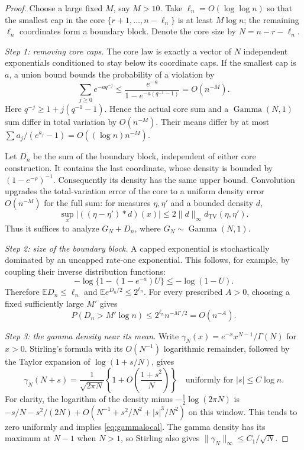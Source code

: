 \documentclass[11pt,oneside]{article}
\numberwithin{equation}{section}
\theoremstyle{plain}
\theoremstyle{definition}
\theoremstyle{remark}
\newcommand{\E}{\mathbb E}
\newcommand{\TV}{d_{\mathrm{TV}}}
\newcommand{\Gam}{\operatorname{Gamma}}
\begin{document}
\begin{proof}
Choose a large fixed $M$, say $M>10$. Take
$\ell_n=O(\log\log n)$ so that the smallest cap in the core
$\{r+1,\ldots,n-\ell_n\}$ is at least $M\log n$; the remaining
$\ell_n$ coordinates form a boundary block. Denote the core size by
$N=n-r-\ell_n$.

\emph{Step 1: removing core caps.}
The core law is exactly a vector of $N$ independent exponentials
conditioned to stay below its coordinate caps. If the smallest cap is
$a$, a union bound bounds the probability of a violation by
\[
 \sum_{j\ge0}e^{-a q^{-j}}
 \le\frac{e^{-a}}{1-e^{-a(q^{-1}-1)}}=O(n^{-M}).
\]
Here $q^{-j}\ge1+j(q^{-1}-1)$. Hence the actual core sum and a
$\Gam(N,1)$ sum differ in total variation by $O(n^{-M})$. Their means
differ by at most
$\sum a_j/(e^{a_j}-1)=O((\log n)n^{-M})$.

Let $D_n$ be the sum of the boundary block, independent of either
core construction. It contains the last coordinate, whose density is
bounded by $(1-e^{-\rho})^{-1}$. Consequently its density has the same
upper bound. Convolution upgrades the total-variation error of the
core to a uniform density error $O(n^{-M})$ for the full sum: for
measures $\eta,\eta'$ and a bounded density $d$,
\[
 \sup_x|((\eta-\eta')*d)(x)|
 \le 2\|d\|_\infty\TV(\eta,\eta').
\]
Thus it suffices to analyze $G_N+D_n$, where $G_N\sim\Gam(N,1)$.

\emph{Step 2: size of the boundary block.}
A capped exponential is stochastically dominated by an uncapped
rate-one exponential. This follows, for example, by coupling their
inverse distribution functions:
\[
 -\log\{1-(1-e^{-a})U\}\le-\log(1-U).
\]
Therefore $\E D_n\le\ell_n$ and
$\E e^{D_n/2}\le2^{\ell_n}$. For every prescribed $A>0$, choosing a
fixed sufficiently large $M'$ gives
\begin{equation}\label{eq:Dbound}
 P(D_n>M'\log n)\le2^{\ell_n}n^{-M'/2}=O(n^{-A}).
\end{equation}

\emph{Step 3: the gamma density near its mean.}
Write $\gamma_N(x)=e^{-x}x^{N-1}/\Gamma(N)$ for $x>0$.
Stirling's formula with its $O(N^{-1})$ logarithmic remainder,
followed by the Taylor expansion of $\log(1+s/N)$, gives
\begin{equation}\label{eq:gammalocal}
 \gamma_N(N+s)=\frac1{\sqrt{2\pi N}}
   \left\{1+O\!\left(\frac{1+s^2}{N}\right)\right\}
 \quad\text{uniformly for }|s|\le C\log n.
\end{equation}
For clarity, the logarithm of the density minus
$-\tfrac12\log(2\pi N)$ is
$-s/N-s^2/(2N)+O(N^{-1}+s^2/N^2+|s|^3/N^2)$ on this window.
This tends to zero uniformly and implies \eqref{eq:gammalocal}.
The gamma density has its maximum at $N-1$ when $N>1$, so Stirling
also gives $\|\gamma_N\|_\infty\le C_1/\sqrt N$.


\end{proof}
\end{document}
